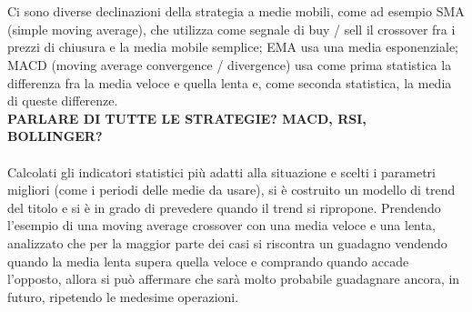 \documentclass{article}
\numberwithin{equation}{section}
\begin{document}
		\\~\\
		Ci sono diverse declinazioni della strategia a medie mobili, come ad esempio SMA (simple moving average), che utilizza come segnale di buy / sell il crossover fra i prezzi di chiusura e la media mobile semplice; EMA usa una media esponenziale; MACD (moving average convergence / divergence) usa come prima statistica la differenza fra la media veloce e quella lenta e, come seconda statistica, la media di queste differenze.
		\\\textbf{PARLARE DI TUTTE LE STRATEGIE? MACD, RSI, BOLLINGER?}
		\\~\\
		Calcolati gli indicatori statistici più adatti alla situazione e scelti i parametri migliori (come i periodi delle medie da usare), si è costruito un modello di trend del titolo e si è in grado di prevedere quando il trend si ripropone. Prendendo l'esempio di una moving average crossover con una media veloce e una lenta, analizzato che per la maggior parte dei casi si riscontra un guadagno vendendo quando la media lenta supera quella veloce e comprando quando accade l'opposto, allora si può affermare che sarà molto probabile guadagnare ancora, in futuro, ripetendo le medesime operazioni.
		
		
\end{document}
